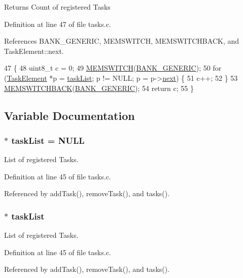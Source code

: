 \begin{DoxyReturn}{Returns}
Count of registered Tasks 
\end{DoxyReturn}


Definition at line 47 of file tasks.\-c.



References B\-A\-N\-K\-\_\-\-G\-E\-N\-E\-R\-I\-C, M\-E\-M\-S\-W\-I\-T\-C\-H, M\-E\-M\-S\-W\-I\-T\-C\-H\-B\-A\-C\-K, and Task\-Element\-::next.


\begin{DoxyCode}
47                               \{
48     uint8\_t c = 0;
49     \hyperlink{group__xmem_ga253830e5022f2aa99177acd8a0ba0bfe}{MEMSWITCH}(\hyperlink{group__xmem_ga6b1167d0078b33af8ec17ededaebe0cb}{BANK\_GENERIC});
50     \textcolor{keywordflow}{for} (\hyperlink{struct_task_element}{TaskElement} *p = \hyperlink{group__task_gaadf0c3981f1a6c7cc610de145a1d5461}{taskList}; p != NULL; p = p->\hyperlink{struct_task_element_ac0faa835255f5aba0bdb6fe9083d9d7d}{next}) \{
51         c++;
52     \}
53     \hyperlink{group__xmem_ga96199c8c5e6fbc65dd60aa67de63fd34}{MEMSWITCHBACK}(\hyperlink{group__xmem_ga6b1167d0078b33af8ec17ededaebe0cb}{BANK\_GENERIC});
54     \textcolor{keywordflow}{return} c;
55 \}
\end{DoxyCode}


\subsection{Variable Documentation}
\hypertarget{group__task_gaadf0c3981f1a6c7cc610de145a1d5461}{
\subsubsection[{task\-List}]{$\ast$ task\-List = N\-U\-L\-L}}\label{group__task_gaadf0c3981f1a6c7cc610de145a1d5461}


List of registered Tasks. 



Definition at line 45 of file tasks.\-c.



Referenced by add\-Task(), remove\-Task(), and tasks().

\hypertarget{group__task_gaadf0c3981f1a6c7cc610de145a1d5461}{
\subsubsection[{task\-List}]{$\ast$ task\-List}}\label{group__task_gaadf0c3981f1a6c7cc610de145a1d5461}


List of registered Tasks. 



Definition at line 45 of file tasks.\-c.



Referenced by add\-Task(), remove\-Task(), and tasks().

